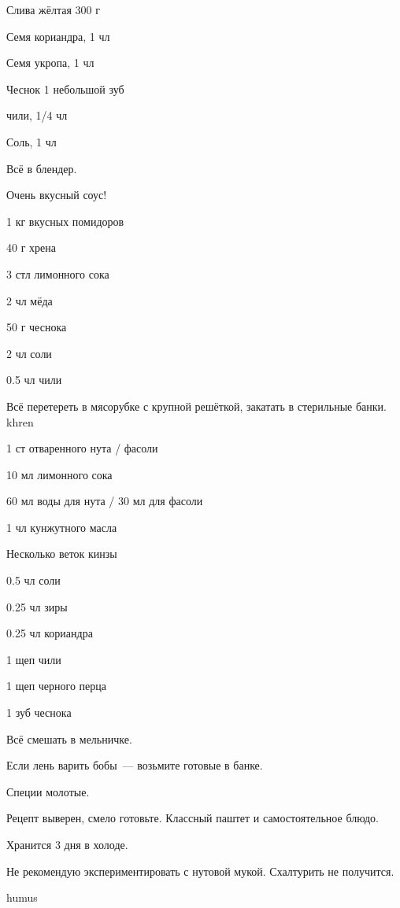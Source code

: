 {
\item Слива жёлтая 300 г
}{
\item Семя кориандра, 1 чл
\item Семя укропа, 1 чл
\item Чеснок 1 небольшой зуб
\item чили, 1/4 чл
\item Соль, 1 чл
}{
Всё в блендер.  
}{
\begin{advice}
\item Очень вкусный соус! 
\end{advice}}{}



{
\item 1 кг вкусных помидоров
\item 40 г хрена
\item 3 стл лимонного сока
\item 2 чл мёда
}{
\item 50 г чеснока
\item 2 чл соли
\item 0.5 чл чили 
}{
Всё перетереть в мясорубке с крупной решёткой, закатать в стерильные банки.
}{}{khren}



{
\item 1 ст отваренного нута / фасоли
\item 10 мл лимонного сока
\item 60 мл воды для нута / 30 мл для фасоли
\item 1 чл кунжутного масла
\item Несколько веток кинзы 
}{
\item 0.5 чл соли
\item 0.25 чл зиры
\item 0.25 чл кориандра
\item 1 щеп чили
\item 1 щеп черного перца
\item 1 зуб чеснока
}{
Всё смешать в мельничке.
}{
\begin{advice}
\item Если лень варить бобы~--- возьмите готовые в банке. 
\item Специи молотые. 
\item Рецепт выверен, смело готовьте. Классный паштет и самостоятельное блюдо.
\item Хранится 3 дня в холоде.
\item Не рекомендую экспериментировать с нутовой мукой. Схалтурить не получится.
\end{advice}}{humus}




